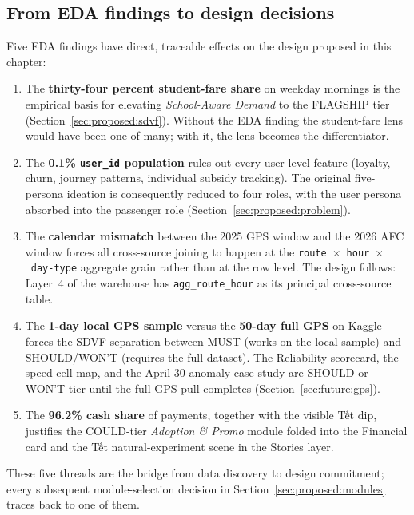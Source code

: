 \subsection{From EDA findings to design decisions}
\label{sec:proposed:eda_to_design}

Five EDA findings have direct, traceable effects on the design
proposed in this chapter:

\begin{enumerate}
\item The \textbf{thirty-four percent student-fare share} on
    weekday mornings is the empirical basis for elevating
    \emph{School-Aware Demand} to the FLAGSHIP tier
    (Section~\ref{sec:proposed:sdvf}). Without the EDA finding
    the student-fare lens would have been one of many; with it,
    the lens becomes the differentiator.
\item The \textbf{0.1\% \texttt{user\_id} population} rules out
    every user-level feature (loyalty, churn, journey patterns,
    individual subsidy tracking). The original five-persona
    ideation is consequently reduced to four roles, with the
    user persona absorbed into the passenger role
    (Section~\ref{sec:proposed:problem}).
\item The \textbf{calendar mismatch} between the 2025 GPS window
    and the 2026 AFC window forces all cross-source joining to
    happen at the
    \texttt{route}~$\times$~\texttt{hour}~$\times$~\texttt{day-type}
    aggregate grain rather than at the row level. The design
    follows: Layer~4 of the warehouse has
    \texttt{agg\_route\_hour} as its principal cross-source
    table.
\item The \textbf{1-day local GPS sample} versus the
    \textbf{50-day full GPS} on Kaggle forces the SDVF separation
    between MUST (works on the local sample) and SHOULD/WON'T
    (requires the full dataset). The Reliability scorecard, the
    speed-cell map, and the April-30 anomaly case study are
    SHOULD or WON'T-tier until the full GPS pull completes
    (Section~\ref{sec:future:gps}).
\item The \textbf{96.2\% cash share} of payments, together with
    the visible Tết dip, justifies the COULD-tier
    \emph{Adoption \& Promo} module folded into the Financial
    card and the Tết natural-experiment scene in the Stories
    layer.
\end{enumerate}

These five threads are the bridge from data discovery to design
commitment; every subsequent module-selection decision in
Section~\ref{sec:proposed:modules} traces back to one of them.
